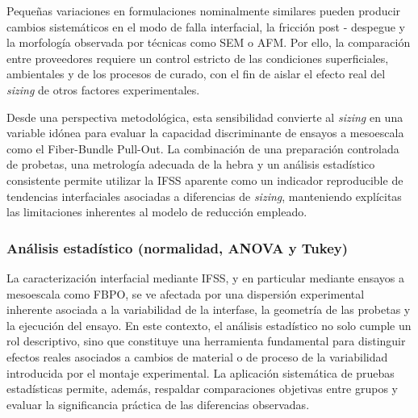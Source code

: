 Pequeñas variaciones en formulaciones nominalmente similares pueden producir cambios sistemáticos en
el modo de falla interfacial, la fricción post - despegue y la morfología observada por técnicas como
SEM o AFM. Por ello, la comparación entre proveedores requiere un control estricto de las condiciones
superficiales, ambientales y de los procesos de curado, con el fin de aislar el efecto real del
\textit{sizing} de otros factores experimentales.

Desde una perspectiva metodológica, esta sensibilidad convierte al \textit{sizing} en una variable
idónea para evaluar la capacidad discriminante de ensayos a mesoescala como el Fiber-Bundle Pull-Out.
La combinación de una preparación controlada de probetas, una metrología adecuada de la hebra y un
análisis estadístico consistente permite utilizar la IFSS aparente como un indicador reproducible de
tendencias interfaciales asociadas a diferencias de \textit{sizing}, manteniendo explícitas las
limitaciones inherentes al modelo de reducción empleado.

\subsubsection{Análisis estadístico (normalidad, ANOVA y Tukey)}

La caracterización interfacial mediante IFSS, y en particular mediante ensayos a mesoescala como
FBPO, se ve afectada por una dispersión experimental inherente asociada a la variabilidad de la
interfase, la geometría de las probetas y la ejecución del ensayo. En este contexto, el análisis
estadístico no solo cumple un rol descriptivo, sino que constituye una herramienta fundamental para
distinguir efectos reales asociados a cambios de material o de proceso de la variabilidad introducida
por el montaje experimental. La aplicación sistemática de pruebas estadísticas permite, además,
respaldar comparaciones objetivas entre grupos y evaluar la significancia práctica de las diferencias
observadas.

